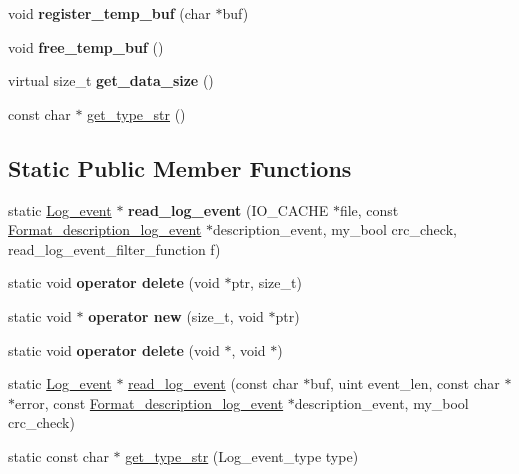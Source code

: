 \begin{DoxyCompactItemize}
void {\bfseries register\+\_\+temp\+\_\+buf} (char $\ast$buf)
\item 
\mbox{\label{classLog__event_ab204392000058d02298c15fa4d8b9659}} 
void {\bfseries free\+\_\+temp\+\_\+buf} ()
\item 
\mbox{\label{classLog__event_a3a03fc8396b68aecbca1ce812a37e455}} 
virtual size\+\_\+t {\bfseries get\+\_\+data\+\_\+size} ()
\item 
const char $\ast$ \mbox{\hyperlink{classLog__event_a2490b26defb775390f1d1e99b72ed0f1}{get\+\_\+type\+\_\+str}} ()
\end{DoxyCompactItemize}
\subsection*{Static Public Member Functions}
\begin{DoxyCompactItemize}
\item 
\mbox{\label{classLog__event_aade5bc04a4b1878b73ff29f39410a532}} 
static \mbox{\hyperlink{classLog__event}{Log\+\_\+event}} $\ast$ {\bfseries read\+\_\+log\+\_\+event} (I\+O\+\_\+\+C\+A\+C\+HE $\ast$file, const \mbox{\hyperlink{classFormat__description__log__event}{Format\+\_\+description\+\_\+log\+\_\+event}} $\ast$description\+\_\+event, my\+\_\+bool crc\+\_\+check, read\+\_\+log\+\_\+event\+\_\+filter\+\_\+function f)
\item 
\mbox{\label{classLog__event_a5ae877aef23d7eb1cd52b3cb1bbc1d90}} 
static void {\bfseries operator delete} (void $\ast$ptr, size\+\_\+t)
\item 
\mbox{\label{classLog__event_ad2b89e830fbd0b0853a695947839fd26}} 
static void $\ast$ {\bfseries operator new} (size\+\_\+t, void $\ast$ptr)
\item 
\mbox{\label{classLog__event_a06ff6af3a2477ffaa9ad21243bdc9bc9}} 
static void {\bfseries operator delete} (void $\ast$, void $\ast$)
\item 
static \mbox{\hyperlink{classLog__event}{Log\+\_\+event}} $\ast$ \mbox{\hyperlink{classLog__event_a5b13b5e395cd4ef015dc874af6128307}{read\+\_\+log\+\_\+event}} (const char $\ast$buf, uint event\+\_\+len, const char $\ast$$\ast$error, const \mbox{\hyperlink{classFormat__description__log__event}{Format\+\_\+description\+\_\+log\+\_\+event}} $\ast$description\+\_\+event, my\+\_\+bool crc\+\_\+check)
\item 
static const char $\ast$ \mbox{\hyperlink{classLog__event_a7fcd48f109191f0aab883877e2d0bc6d}{get\+\_\+type\+\_\+str}} (Log\+\_\+event\+\_\+type type)
\end{DoxyCompactItemize}
